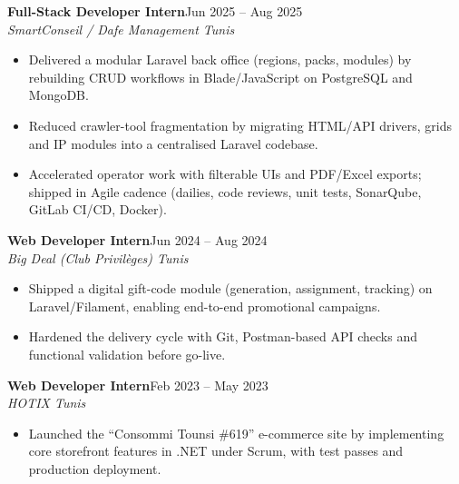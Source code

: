 \documentclass[10pt,a4paper]{article}
\newcommand{\job}[3]{%
 \textbf{\color{primary}#1}\hfill{\color{muted}\small #2}\\[-1pt]
 {\color{accent}\textit{#3}}\\[2pt]
 \begin{itemize}[leftmargin=0.85em, itemsep=1pt, topsep=0pt, parsep=0pt, partopsep=0pt]
}
\begin{document}
\job{Full-Stack Developer Intern}{Jun 2025 -- Aug 2025}{SmartConseil / Dafe Management \textbar{} Tunis}
 \item Delivered a modular Laravel back office (regions, packs, modules) by rebuilding CRUD workflows in Blade/JavaScript on PostgreSQL and MongoDB.
 \item Reduced crawler-tool fragmentation by migrating HTML/API drivers, grids and IP modules into a centralised Laravel codebase.
 \item Accelerated operator work with filterable UIs and PDF/Excel exports; shipped in Agile cadence (dailies, code reviews, unit tests, SonarQube, GitLab CI/CD, Docker).
\end{itemize}

\job{Web Developer Intern}{Jun 2024 -- Aug 2024}{Big Deal (Club Privilèges) \textbar{} Tunis}
 \item Shipped a digital gift-code module (generation, assignment, tracking) on Laravel/Filament, enabling end-to-end promotional campaigns.
 \item Hardened the delivery cycle with Git, Postman-based API checks and functional validation before go-live.
\end{itemize}

\job{Web Developer Intern}{Feb 2023 -- May 2023}{HOTIX \textbar{} Tunis}
 \item Launched the ``Consommi Tounsi \#619'' e-commerce site by implementing core storefront features in .NET under Scrum, with test passes and production deployment.
\end{itemize}

\end{document}

